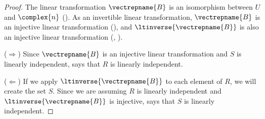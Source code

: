 %
\begin{proof}
The linear transformation $\vectrepname{B}$ is an isomorphism between $U$ and $\complex{n}$ ().   As an invertible linear transformation, $\vectrepname{B}$ is an injective linear transformation (),  and $\ltinverse{\vectrepname{B}}$ is also an injective linear transformation (, ).\par
%
($\Rightarrow$)  Since $\vectrepname{B}$ is an injective linear transformation and $S$ is linearly independent,  says that $R$ is linearly independent.\par
%
($\Leftarrow$)  If we apply $\ltinverse{\vectrepname{B}}$ to each element of $R$, we will create the set $S$.  Since we are assuming $R$ is linearly independent and $\ltinverse{\vectrepname{B}}$ is injective,  says that $S$ is linearly independent.
%
\end{proof}
%


